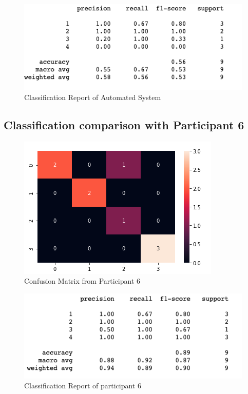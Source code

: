 \begin{figure}[!htp]
    \includegraphics[width=\textwidth]{Images/a5r.png}
    \caption{Classification Report of Automated System}
    \label{fig:f11}
\end{figure}

\pagebreak
\subsection*{Classification comparison with Participant 6}

\begin{figure}[!htp]
    \includegraphics[width=\textwidth]{Images/p6.png}
    \caption{Confusion Matrix from Participant 6}
    \label{fig:f11}
\end{figure}

\begin{figure}[!htp]
    \includegraphics[width=\textwidth]{Images/p6r.png}
    \caption{Classification Report of participant 6}
    \label{fig:f11}
\end{figure}

